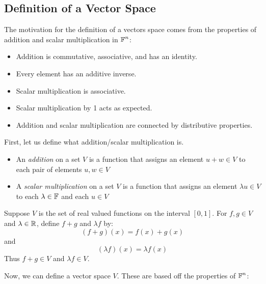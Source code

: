 \subsection{Definition of a Vector Space}

The motivation for the definition of a vectors space comes from the
properties of addition and scalar multiplication in $\operatorname{\mathbb{F}}^n$:
\begin{itemize}
    \item Addition is commutative, associative, and has an identity.
    \item Every element has an additive inverse.
    \item Scalar multiplication is associative.
    \item Scalar multiplication by 1 acts as expected.
    \item Addition and scalar multiplication are connected by distributive properties.
\end{itemize}

First, let us define what addition/scalar multiplication is.
\begin{definition}
    \begin{itemize}
        \item An \textit{addition} on a set $V$ is a function that assigns an element $u + w \in V$ to each pair of elements $u, w \in V$
        \item A \textit{scalar multiplication} on a set $V$ is a function that assigns an element $\lambda u \in V$ to each $\lambda \in \operatorname{\mathbb{F}}$ and each $u \in V$
    \end{itemize}
\end{definition}

\begin{example}
    Suppose $V$ is the set of real valued functions on the interval $[0, 1]$.
    For $f, g \in V$ and $\lambda \in \operatorname{\mathbb{R}}$, define $f + g$ and $\lambda f$ by:
    \[ (f+g)(x) = f(x) + g(x) \]
    and
    \[ (\lambda f)(x) = \lambda f(x) \]
    Thus $f + g \in V$ and $\lambda f \in V$.
\end{example}

Now, we can define a vector space $V$. These are based off the
properties of $\operatorname{\mathbb{F}}^n$:

